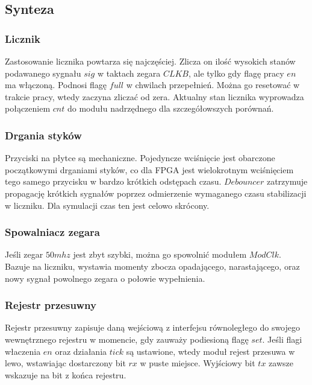 \documentclass[a4paper,12pt]{article}
\begin{document}
\subsection{Synteza}

\subsubsection{Licznik}
Zastosowanie licznika powtarza się najczęściej. Zlicza on ilość wysokich stanów podawanego sygnału $sig$ w taktach zegara $CLKB$, ale tylko gdy flagę pracy $en$ ma włączoną. Podnosi flagę $full$ w chwilach przepełnień. Można go resetować w trakcie pracy, wtedy zaczyna zliczać od zera. Aktualny stan licznika wyprowadza połączeniem $cnt$ do modułu nadrzędnego dla szczegółowszych porównań.


\subsubsection{Drgania styków}
Przyciski na płytce są mechaniczne. Pojedyncze wciśnięcie jest obarczone początkowymi drganiami styków, co dla FPGA jest wielokrotnym wciśnięciem tego samego przycisku w bardzo krótkich odstępach czasu. $Debouncer$ zatrzymuje propagację krótkich sygnałów poprzez odmierzenie wymaganego czasu stabilizacji w liczniku. Dla symulacji czas ten jest celowo skrócony.


\subsubsection{Spowalniacz zegara}
Jeśli zegar $50mhz$ jest zbyt szybki, można go spowolnić modułem $ModClk$. Bazuje na liczniku, wystawia momenty zbocza opadającego, narastającego, oraz nowy sygnał powolnego zegara o połowie wypełnienia.


\subsubsection{Rejestr przesuwny}
Rejestr przesuwny zapisuje daną wejściową z interfejsu równoległego do swojego wewnętrznego rejestru w momencie, gdy zauważy podiesioną flagę $set$. Jeśli flagi właczenia $en$ oraz działania $tick$ są ustawione, wtedy moduł rejest przesuwa w lewo, wstawiając dostarczony bit $rx$ w puste miejsce. Wyjściowy bit $tx$ zawsze wskazuje na bit z końca rejestru.

\end{document}
